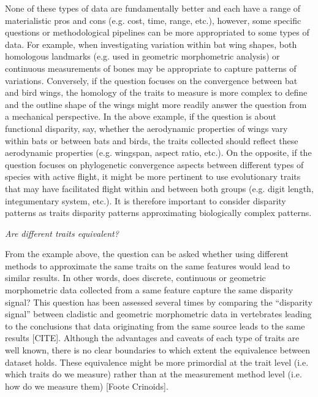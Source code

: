 \documentclass[12pt,letterpaper]{article}
\renewcommand{\subsection}[1]{%
\bigskip
\begin{center}
\begin{large}
\normalfont\itshape #1
\end{large}
\end{center}}
\begin{document}
None of these types of data are fundamentally better and each have a range of materialistic pros and cons (e.g. cost, time, range, etc.), however, some specific questions or methodological pipelines can be more appropriated to some types of data.
For example, when investigating variation within bat wing shapes, both homologous landmarks (e.g. used in geometric morphometric analysis) or continuous measurements of bones may be appropriate to capture patterns of variations.
Conversely, if the question focuses on the convergence between bat and bird wings, the homology of the traits to measure is more complex to define and the outline shape of the wings might more readily answer the question from a mechanical perspective.
In the above example, if the question is about functional disparity, say, whether the aerodynamic properties of wings vary within bats or between bats and birds, the traits collected should reflect these aerodynamic properties (e.g. wingspan, aspect ratio, etc.).
On the opposite, if the question focuses on phylogenetic convergence aspects between different types of species with active flight, it might be more pertinent to use evolutionary traits that may have facilitated flight within and between both groups (e.g. digit length, integumentary system, etc.).
It is therefore important to consider disparity patterns as traits disparity patterns approximating biologically complex patterns.

\subsection{Are different traits equivalent?}

From the example above, the question can be asked whether using different methods to approximate the same traits on the same features would lead to similar results.
In other words, does discrete, continuous or geometric morphometric data collected from a same feature capture the same disparity signal?
This question has been assessed several times by comparing the ``disparity signal'' between cladistic and geometric morphometric data in vertebrates leading to the conclusions that data originating from the same source leads to the same results [CITE].
Although the advantages and caveats of each type of traits are well known, there is no clear boundaries to which extent the equivalence between dataset holds.
These equivalence might be more primordial at the trait level (i.e. which traits do we measure) rather than at the measurement method level (i.e. how do we measure them) [Foote Crinoids].
\end{document}
